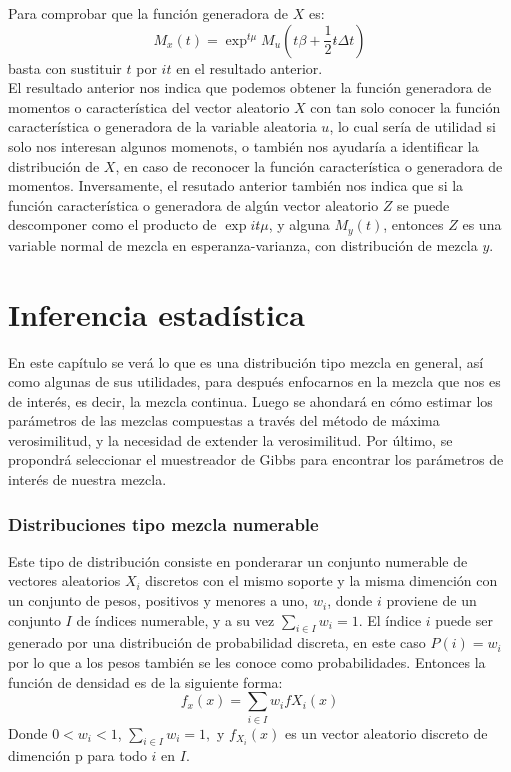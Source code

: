 \documentclass[11pt]{book}
\begin{document}
Para comprobar que la función generadora de $X$ es:
\begin{equation*}
M_{x}(t)=\exp^{t\acute{}\mu}M_{u}(t\beta+\dfrac{1}{2}t\acute{}\Delta t)
\end{equation*}
  basta con sustituir $t$ por $it$ en el resultado anterior.\\

El resultado anterior nos indica que podemos obtener la función generadora de momentos o característica del vector aleatorio $X$ con tan solo conocer la función característica o generadora de la variable aleatoria $u$, lo cual sería de utilidad si solo nos interesan algunos momenots, o también nos ayudaría a identificar la distribución de $X$, en caso de reconocer la función característica o generadora de momentos. Inversamente, el resutado anterior también nos indica que si la función característica o generadora de algún vector aleatorio $Z$ se puede descomponer como el producto de $\exp{it\acute{}\mu} $, y alguna $M_{y}(t)$, entonces $Z$ es una variable normal de mezcla en esperanza-varianza, con distribución de mezcla $y$.\\

\chapter*{Inferencia estadística}
En este capítulo se verá lo que es una distribución tipo mezcla en general, así como algunas de sus utilidades, para después enfocarnos en la mezcla que nos es de interés, es decir, la mezcla continua. Luego se ahondará en cómo estimar los parámetros de las mezclas compuestas a través del método de máxima verosimilitud, y la necesidad de extender la verosimilitud. Por último, se propondrá seleccionar el muestreador de Gibbs para encontrar los parámetros de interés de nuestra mezcla.\\

\subsection*{Distribuciones tipo mezcla numerable}
Este tipo de distribución consiste en ponderarar un conjunto numerable de vectores aleatorios $X_{i}$  discretos con el mismo soporte y la misma dimención con un conjunto de pesos, positivos y menores a uno, $w_{i}$, donde $i$ proviene de un conjunto $I$ de índices numerable, y a su vez $\sum_{i\in I}w_{i}=1$. El índice $i$ puede ser generado por una distribución de probabilidad discreta, en este caso $P(i)=w_{i}$ por lo que a los pesos también se les conoce como probabilidades. Entonces la función de densidad es de la siguiente forma:\\
\begin{equation*}
f_{x}(x)= \sum_{i\in I}w_{i}f{X_{i}}(x)
\end{equation*}
 Donde  $0<w_{i}<1$, $\sum_{i\in I}w_{i}=1,$ y $  f_{X_{i}}(x)$ es un vector aleatorio discreto de dimención p para todo $i$ en $I$.\\
\end{document}
